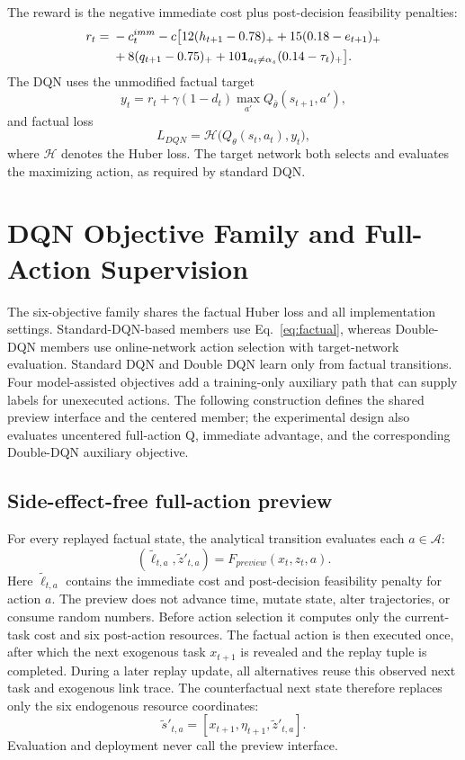 \documentclass[11pt]{article}
\begin{document}
The reward is the negative immediate cost plus post-decision feasibility penalties:
\begin{align}
r_t={}&-c_t^{imm}-c\big[12(h_{t+1}-0.78)_+ +15(0.18-e_{t+1})_+\notag\\
&+8(q_{t+1}-0.75)_+ +10\mathbf 1_{a_t\ne\alpha_s}(0.14-\tau_t)_+\big].
\label{eq:reward}
\end{align}
The DQN uses the unmodified factual target
\begin{equation}
y_t=r_t+\gamma(1-d_t)\max_{a'}Q_{\bar\theta}(s_{t+1},a'),
\label{eq:factual}
\end{equation}
and factual loss
\begin{equation}
L_{DQN}=\mathcal H\big(Q_\theta(s_t,a_t),y_t\big),
\end{equation}
where $\mathcal H$ denotes the Huber loss. The target network both selects and evaluates the maximizing action, as required by standard DQN.

\section{DQN Objective Family and Full-Action Supervision}
\label{sec:method}

The six-objective family shares the factual Huber loss and all implementation settings. Standard-DQN-based members use Eq.~\eqref{eq:factual}, whereas Double-DQN members use online-network action selection with target-network evaluation. Standard DQN and Double DQN learn only from factual transitions. Four model-assisted objectives add a training-only auxiliary path that can supply labels for unexecuted actions. The following construction defines the shared preview interface and the centered member; the experimental design also evaluates uncentered full-action Q, immediate advantage, and the corresponding Double-DQN auxiliary objective.

\subsection{Side-effect-free full-action preview}

For every replayed factual state, the analytical transition evaluates each $a\in\mathcal A$:
\begin{equation}
(\tilde \ell_{t,a},\tilde z'_{t,a})=F_{preview}(x_t,z_t,a).
\end{equation}
Here $\tilde \ell_{t,a}$ contains the immediate cost and post-decision feasibility penalty for action $a$. The preview does not advance time, mutate state, alter trajectories, or consume random numbers. Before action selection it computes only the current-task cost and six post-action resources. The factual action is then executed once, after which the next exogenous task $x_{t+1}$ is revealed and the replay tuple is completed. During a later replay update, all alternatives reuse this observed next task and exogenous link trace. The counterfactual next state therefore replaces only the six endogenous resource coordinates:
\begin{equation}
\tilde s'_{t,a}=[x_{t+1},\eta_{t+1},\tilde z'_{t,a}].
\end{equation}
Evaluation and deployment never call the preview interface.
\end{document}
